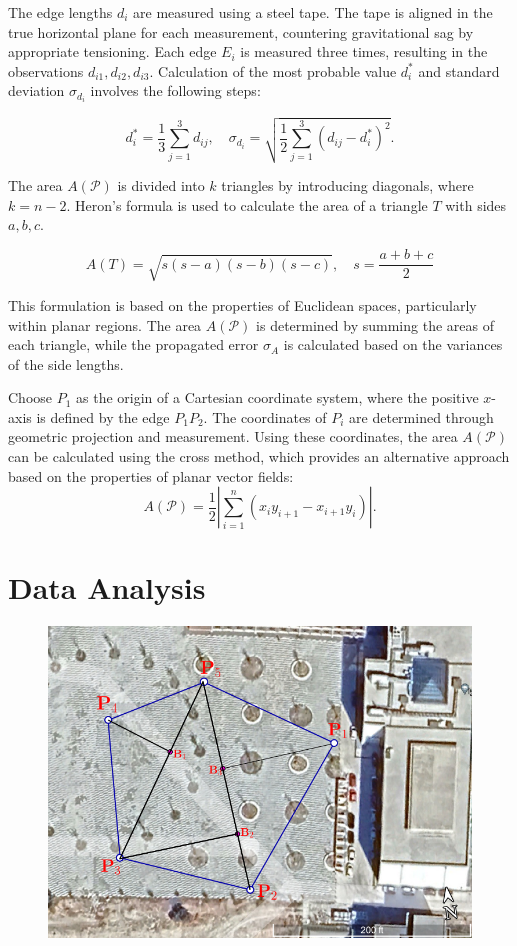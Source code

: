 \documentclass[12pt]{report}
\begin{document}
The edge lengths \(d_i\) are measured using a steel tape. The tape is aligned in the true horizontal plane for each measurement, countering gravitational sag by appropriate tensioning. Each edge \(E_i\) is measured three times, resulting in the observations \(d_{i1}, d_{i2}, d_{i3}\). Calculation of the most probable value \(d_i^*\) and standard deviation \(\sigma_{d_i}\) involves the following steps:

\[
d_i^* = \frac{1}{3} \sum_{j=1}^{3} d_{ij}, \quad \sigma_{d_i} = \sqrt{\frac{1}{2} \sum_{j=1}^{3} (d_{ij} - d_i^*)^2}.
\]

The area \(A(\mathcal{P})\) is divided into \(k\) triangles by introducing diagonals, where \(k = n-2\). Heron's formula is used to calculate the area of a triangle \(T\) with sides \(a, b, c\).

\[
A(T) = \sqrt{s(s-a)(s-b)(s-c)}, \quad s = \frac{a+b+c}{2}
\]

This formulation is based on the properties of Euclidean spaces, particularly within planar regions. The area \(A(\mathcal{P})\) is determined by summing the areas of each triangle, while the propagated error \(\sigma_A\) is calculated based on the variances of the side lengths.

Choose \(P_1\) as the origin of a Cartesian coordinate system, where the positive \(x\)-axis is defined by the edge \(P_1P_2\). The coordinates of \(P_i\) are determined through geometric projection and measurement. Using these coordinates, the area \(A(\mathcal{P})\) can be calculated using the cross method, which provides an alternative approach based on the properties of planar vector fields:
\[
A(\mathcal{P}) = \frac{1}{2} \left| \sum_{i=1}^{n} (x_iy_{i+1} - x_{i+1}y_i) \right|.
\]



\section*{Data Analysis}

\begin{figure}[ht!]
    \centering
    \includegraphics[width=0.8\linewidth]{a.png}
\end{figure}
\end{document}
